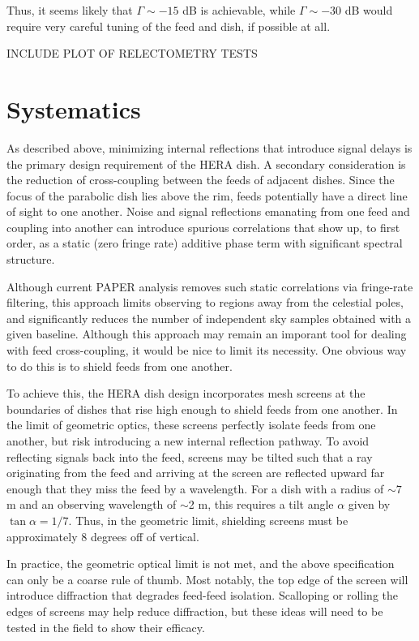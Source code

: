 \documentclass[11pt]{article}
\begin{document}
Thus, it seems likely that $\Gamma\sim-15$ dB is achievable, while $\Gamma\sim-30$ dB
would require very careful tuning of the feed and dish, if possible at all.

INCLUDE PLOT OF RELECTOMETRY TESTS

\section{Systematics}

As described above, minimizing internal reflections that introduce signal delays is
the primary design requirement of the HERA dish.  A secondary consideration is the
reduction of cross-coupling between the feeds of adjacent dishes.  Since the focus of
the parabolic dish lies above the rim, feeds potentially have a direct line of sight to
one another.  Noise and signal reflections emanating from one feed and coupling into another
can introduce spurious correlations that show up, to first order, as a static (zero fringe rate) additive
phase term with significant spectral structure.  

Although current PAPER analysis removes such static correlations via fringe-rate filtering, this
approach limits observing to regions away from the celestial poles, and significantly reduces the number
of independent sky samples obtained with a given baseline.  Although this approach may remain an
imporant tool for dealing with feed cross-coupling, it would be nice to limit its necessity.
One obvious way to do this is to shield feeds from one another.

To achieve this, the HERA dish design incorporates mesh screens at the boundaries of dishes that rise high
enough to shield feeds from one another.  In the limit of geometric optics, these screens perfectly isolate
feeds from one another, but risk introducing a new internal reflection pathway.  To avoid reflecting signals back into the feed,
screens may be tilted such that a ray originating from the feed and arriving at the screen are
reflected upward far enough that they miss the feed by a wavelength.
For a dish with a radius of $\sim7$ m and an observing wavelength of $\sim$2 m, this requires a tilt angle $\alpha$
given by $\tan\alpha=1/7$.  Thus, in the geometric limit, shielding screens must be approximately 8 degrees off of vertical.

In practice, the geometric optical limit is not met, and the above specification can only be a coarse rule of thumb.
Most notably, the top edge of the screen will introduce diffraction that degrades feed-feed isolation.  Scalloping
or rolling the edges of screens may help reduce diffraction, but these ideas will need to be tested in the field to
show their efficacy.
\end{document}

